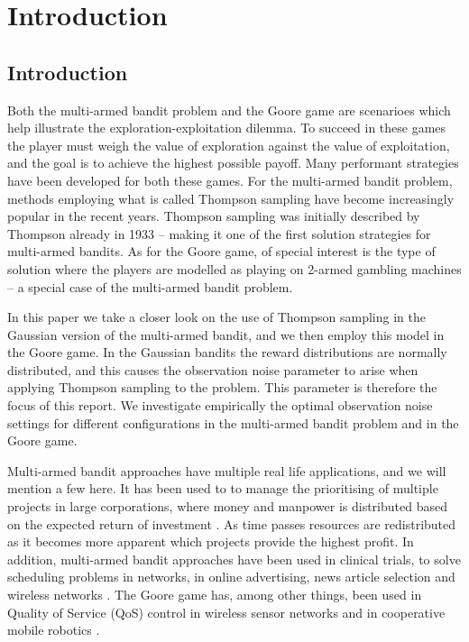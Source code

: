 \chapter{Introduction}
\label{ch:introduction}

\section{Introduction}
Both the multi-armed bandit problem and the Goore game are scenarioes which help illustrate the exploration-exploitation dilemma.
To succeed in these games the player must weigh the value of exploration against the value of exploitation, and the goal is to achieve the highest possible payoff.
Many performant strategies have been developed for both these games.
For the multi-armed bandit problem, methods employing what is called Thompson sampling \cite{Thompson1933} have become increasingly popular in the recent years.
Thompson sampling was initially described by Thompson already in 1933 -- making it one of the first solution strategies for multi-armed bandits.
As for the Goore game, of special interest is the type of solution where the players are modelled as playing on 2-armed gambling machines -- a special case of the multi-armed bandit problem.

In this paper we take a closer look on the use of Thompson sampling in the Gaussian version of the multi-armed bandit, and we then employ this model in the Goore game.
In the Gaussian bandits the reward distributions are normally distributed, and this causes the observation noise parameter \ob{} to arise when applying Thompson sampling to the problem.
This parameter is therefore the focus of this report.
We investigate empirically the optimal observation noise settings for different configurations in the multi-armed bandit problem and in the Goore game.

Multi-armed bandit approaches have multiple real life applications, and we will mention a few here.
It has been used to to manage the prioritising of multiple projects in large corporations, where money and manpower is distributed based on the expected return of investment \cite{Glimsdal12}.
As time passes resources are redistributed as it becomes more apparent which projects provide the highest profit.
In addition, multi-armed bandit approaches have been used in clinical trials, to solve scheduling problems in networks, in online advertising, news article selection and wireless networks \cite{Granmo07, Glimsdal12}. The Goore game has, among other things, been used in Quality of Service (QoS) control in wireless sensor networks and in cooperative mobile robotics \cite{Glimsdal12}.

